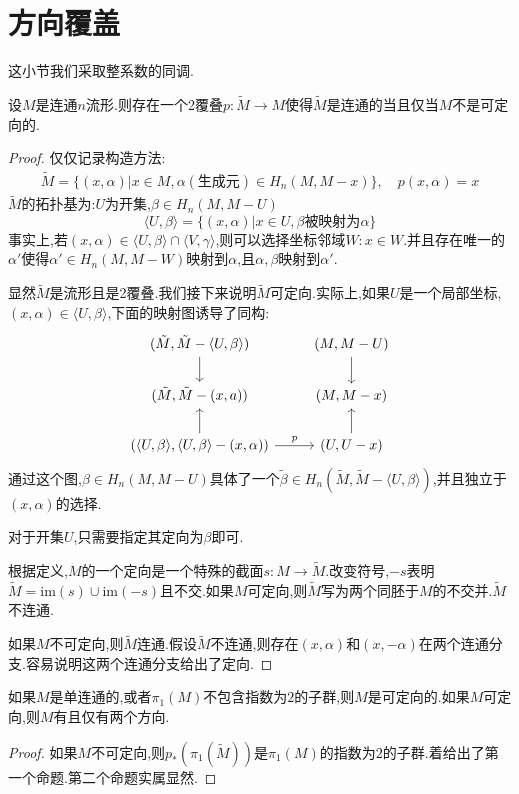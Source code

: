 \section{方向覆盖}
这小节我们采取整系数的同调.
\begin{proposition}
    设$M$是连通$n$流形.则存在一个2覆叠$p:\tilde{M}\to M$使得$\tilde{M}$是连通的当且仅当$M$不是可定向的.
\end{proposition}
\begin{proof}
    仅仅记录构造方法:
    \begin{align*}
        \tilde{M}=\{(x,\alpha)|x \in M,\alpha(\text{生成元}) \in H_n(M,M-x)\}, \quad p(x,\alpha)=x
    \end{align*}
    $\tilde{M}$的拓扑基为:$U$为开集,$\beta \in H_n(M,M-U)$
    $$
    \langle U,\beta\rangle=\{(x,\alpha)|x \in U,\beta \text{被映射为}\alpha\}
    $$
    事实上,若$(x,\alpha)\in \langle U,\beta\rangle \cap \langle V,\gamma \rangle$,则可以选择坐标邻域$W:x \in W$.并且存在唯一的$\alpha'$使得$\alpha' \in H_n(M,M-W)$映射到$\alpha$,且$\alpha,\beta$映射到$\alpha'$.

    显然$\tilde{M}$是流形且是2覆叠.我们接下来说明$\tilde{M}$可定向.实际上,如果$U$是一个局部坐标,$(x,\alpha)\in \langle U,\beta \rangle$,下面的映射图诱导了同构:
    \[
        \begin{tikzcd}
	    {(\tilde{M},\tilde{M}-\langle U,\beta\rangle)} & {(M,M-U)} \\
	    {(\tilde{M},\tilde{M}-(x,a))} & {(M,M-x)} \\
	    {(\langle U,\beta\rangle,\langle U,\beta\rangle-(x,\alpha))} & {(U,U-x)}
	    \arrow[from=1-1, to=2-1]
	    \arrow[from=3-1, to=2-1]
	    \arrow["{p }", from=3-1, to=3-2]
	\arrow[from=3-2, to=2-2]
	\arrow[from=1-2, to=2-2]
    \end{tikzcd}
    \]
    通过这个图,$\beta \in H_n(M,M-U)$具体了一个$\tilde{\beta}\in H_n(\tilde{M},\tilde{M}-\langle U,\beta\rangle)$,并且独立于$(x,\alpha)$的选择.

    对于开集$U$,只需要指定其定向为$\beta$即可.

    根据定义,$M$的一个定向是一个特殊的截面$s:M \to \tilde{M}$.改变符号,$-s$表明$\tilde{M}=\mathrm{im}(s)\cup \mathrm{im}(-s)$且不交.如果$M$可定向,则$\tilde{M}$写为两个同胚于$M$的不交并.$\tilde{M}$不连通.
    
    如果$M$不可定向,则$\tilde{M}$连通.假设$\tilde{M}$不连通,则存在$(x,\alpha)$和$(x,-\alpha)$在两个连通分支.容易说明这两个连通分支给出了定向.
\end{proof}
\begin{proposition}
    如果$M$是单连通的,或者$\pi_1(M)$不包含指数为$2$的子群,则$M$是可定向的.如果$M$可定向,则$M$有且仅有两个方向.
\end{proposition}
\begin{proof}
    如果$M$不可定向,则$p_*(\pi_1(\tilde{M}))$是$\pi_1(M)$的指数为$2$的子群.着给出了第一个命题.第二个命题实属显然.
\end{proof}
